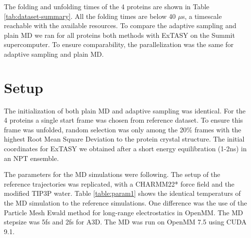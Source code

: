 \begin{table}[H]
\centering
\caption{Proteins for the comparison of adaptive sampling and plain MD. }\label{table:dataset-summary}
\end{table}
The folding and unfolding times of the 4 proteins are shown in Table \ref{tab:dataset-summary}. All the folding times are below 40 $\mu$s, a timescale reachable with the available resources. To compare the adaptive sampling and plain MD we ran for all proteins both methods with ExTASY on the Summit supercomputer. To ensure comparability, the parallelization was the same for adaptive sampling and plain MD.


\section{\label{sec:MD}Setup}

The initialization of both plain MD and adaptive sampling was identical. For the 4 proteins a single start frame was chosen from reference dataset. To ensure this frame was unfolded, random selection was only among the 20\% frames with the highest Root Mean Square Deviation to the
protein crystal structure. The initial coordinates for ExTASY we obtained after a short energy equilibration (1-2ns) in an NPT ensemble. 

The parameters for the MD simulations were following. The setup of the reference trajectories\cite{lindorff2011} was replicated, with a CHARMM22* force field \cite{Charmm22star}
and the modified TIP3P water. Table \ref{table:param1} shows the identical temperaturs of the MD simulation to the reference simulations. One difference was the use of the Particle Mesh Ewald method for long-range electrostatics in OpenMM. The MD stepsize was 5fs and 2fs for A3D. The MD was run on OpenMM 7.5 \cite{openMM} using CUDA 9.1.  

